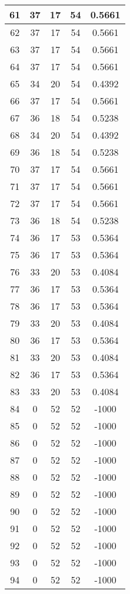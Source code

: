 \documentclass[letterpaper, 12pt]{article}
\begin{document}
\begin{longtable}{|c|c|c|c|c|}
\hline
61 & 37 & 17 & 54 & 0.5661 \\
\hline
62 & 37 & 17 & 54 & 0.5661 \\
\hline
63 & 37 & 17 & 54 & 0.5661 \\
\hline
64 & 37 & 17 & 54 & 0.5661 \\
\hline
65 & 34 & 20 & 54 & 0.4392 \\
\hline
66 & 37 & 17 & 54 & 0.5661 \\
\hline
67 & 36 & 18 & 54 & 0.5238 \\
\hline
68 & 34 & 20 & 54 & 0.4392 \\
\hline
69 & 36 & 18 & 54 & 0.5238 \\
\hline
70 & 37 & 17 & 54 & 0.5661 \\
\hline
71 & 37 & 17 & 54 & 0.5661 \\
\hline
72 & 37 & 17 & 54 & 0.5661 \\
\hline
73 & 36 & 18 & 54 & 0.5238 \\
\hline
74 & 36 & 17 & 53 & 0.5364 \\
\hline
75 & 36 & 17 & 53 & 0.5364 \\
\hline
76 & 33 & 20 & 53 & 0.4084 \\
\hline
77 & 36 & 17 & 53 & 0.5364 \\
\hline
78 & 36 & 17 & 53 & 0.5364 \\
\hline
79 & 33 & 20 & 53 & 0.4084 \\
\hline
80 & 36 & 17 & 53 & 0.5364 \\
\hline
81 & 33 & 20 & 53 & 0.4084 \\
\hline
82 & 36 & 17 & 53 & 0.5364 \\
\hline
83 & 33 & 20 & 53 & 0.4084 \\
\hline
84 & 0 & 52 & 52 & -1000 \\
\hline
85 & 0 & 52 & 52 & -1000 \\
\hline
86 & 0 & 52 & 52 & -1000 \\
\hline
87 & 0 & 52 & 52 & -1000 \\
\hline
88 & 0 & 52 & 52 & -1000 \\
\hline
89 & 0 & 52 & 52 & -1000 \\
\hline
90 & 0 & 52 & 52 & -1000 \\
\hline
91 & 0 & 52 & 52 & -1000 \\
\hline
92 & 0 & 52 & 52 & -1000 \\
\hline
93 & 0 & 52 & 52 & -1000 \\
\hline
94 & 0 & 52 & 52 & -1000 \\
\hline

\end{longtable}
\end{document}
